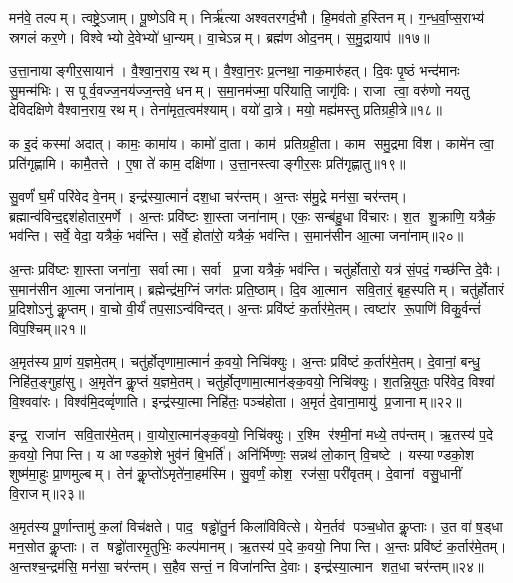 मन॑वे॒ तल्पम्। त्वष्ट्रे॒ऽजाम्। पू॒ष्णेऽविम्। निर्\mbox{}ऋ॑त्या अश्वतरगर्द॒भौ। हि॒मव॑तो ह॒स्तिनम्। ग॒न्ध॒र्वा॒प्स॒राभ्य॑ स्रगलं कर॒णे। विश्वेभ्यो दे॒वेभ्यो॑ धा॒न्यम्। वा॒चेऽन्नम्। ब्रह्म॑ण ओद॒नम्। स॒मु॒द्रायाप॑॥१७॥

उ॒त्ता॒नायाङ्गीर॒सायान॑। वै॒श्वा॒न॒राय॒ रथम्। वै॒श्वा॒न॒रः प्र॒त्नथा॒ नाक॒मारु॑हत्। दि॒वः पृ॒ष्ठं भन्द॑मानः सु॒मन्म॑भिः। स पूर्व॒वज्ज॒नय॑ज्ज॒न्तवे॒ धनम्। स॒मा॒नम॑ज्मा॒ परि॑याति॒ जागृ॑विः। राजा त्वा॒ वरु॑णो नयतु देविदक्षिणे वैश्वान॒राय॒ रथम्। तेना॑मृत॒त्वम॑श्याम्। वयो॑ दा॒त्रे। मयो॒ मह्य॑मस्तु प्रतिग्रही॒त्रे॥१८॥

क इ॒दं कस्मा॑ अदात्। कामः॒ कामा॑य। कामो॑ दा॒ता। काम॑ प्रतिग्रही॒ता। काम समु॒द्रमा वि॑श। कामे॑न त्वा॒ प्रति॑गृह्णामि। कामै॒तत्ते। ए॒षा ते॑ काम॒ दक्षि॑णा। उ॒त्ता॒नस्त्वाङ्गीर॒सः प्रति॑गृह्णातु॥१९॥
\anuvakamend[दा॒ता पुरु॑ष॒मप॑ प्रतिग्रही॒त्रे नव॑ च]

सु॒वर्णं॑ घ॒र्मं परि॑वेद वे॒नम्। इन्द्र॑स्या॒त्मानं॑ दश॒धा चर॑न्तम्। अ॒न्तः स॑मु॒द्रे मन॑सा॒ चर॑न्तम्। ब्रह्मान्व॑विन्द॒द्दश॑होतार॒मर्णे। अ॒न्तः प्रवि॑ष्टः  शा॒स्ता जना॑नाम्। एकः॒ सन्ब॑हु॒धा वि॑चारः। श॒त शु॒क्राणि॒ यत्रैकं॒ भव॑न्ति। सर्वे॒ वेदा॒ यत्रैकं॒ भव॑न्ति। सर्वे॒ होता॑रो॒ यत्रैकं॒ भव॑न्ति। स॒मान॑सीन आ॒त्मा जना॑नाम्॥२०॥%

अ॒न्तः प्रवि॑ष्टः  शा॒स्ता जना॑ना॒ सर्वात्मा। सर्वा प्र॒जा यत्रैकं॒ भव॑न्ति। चतु॑र्\mbox{}होतारो॒ यत्र॑ सं॒पदं॒ गच्छ॑न्ति दे॒वैः। स॒मान॑सीन आ॒त्मा जना॑नाम्। ब्रह्मेन्द्र॑म॒ग्निं जग॑तः प्रति॒ष्ठाम्। दि॒व आ॒त्मान सवि॒तारं॒ बृह॒स्पतिम्। चतु॑र्\mbox{}होतारं प्र॒दिशोऽनु॑ कॢ॒प्तम्। वा॒चो वी॒र्यं॑ तप॒साऽन्व॑विन्दत्। अ॒न्तः प्रवि॑ष्टं क॒र्तार॑मे॒तम्। त्वष्टा॑र रू॒पाणि॑ विकु॒र्वन्तं॑ विप॒श्चिम्॥२१॥

अ॒मृत॑स्य प्रा॒णं य॒ज्ञमे॒तम्। चतु॑र्\mbox{}होतृणामा॒त्मानं॑ क॒वयो॒ निचि॑क्युः। अ॒न्तः प्रवि॑ष्टं क॒र्तार॑मे॒तम्। दे॒वानां॒ बन्धु॒ निहि॑त॒ङ्गुहा॑सु। अ॒मृते॑न कॢ॒प्तं य॒ज्ञमे॒तम्। चतु॑र्\mbox{}होतृणामा॒त्मान॑ङ्क॒वयो॒ निचि॑क्युः। श॒तन्नि॒युतः॒ परि॑वेद॒ विश्वा॑ वि॒श्ववा॑रः। विश्व॑मि॒दव्वृं॑णाति। इन्द्र॑स्या॒त्मा निहि॑तः॒ पञ्च॑होता। अ॒मृतं॑ दे॒वाना॒मायु॑ प्र॒जानाम्॥२२॥%

इन्द्र॒ राजा॑न सवि॒तार॑मे॒तम्। वा॒योरा॒त्मान॑ङ्क॒वयो॒ निचि॑क्युः। र॒श्मि र॑श्मी॒नां मध्ये॒ तप॑न्तम्। ऋ॒तस्य॑ प॒दे क॒वयो॒ निपान्ति। य आण्डको॒शे भुव॑नं बि॒भर्ति॑। अनि॑र्भिण्णः॒ सन्नथ॑ लो॒कान् वि॒चष्टे। यस्याण्डको॒श शुष्म॑मा॒हुः प्रा॒णमुल्बम्। तेन॑ कॢ॒प्तो॑ऽमृते॑ना॒हम॑स्मि। सु॒वर्णं॒ कोश॒ रज॑सा॒ परी॑वृतम्। दे॒वानां वसु॒धानीं  वि॒राजम्॥२३॥%

अ॒मृत॑स्य पू॒र्णान्तामु॑ क॒लां  विच॑क्षते। पाद॒ षड्ढो॑तु॒र्न किला॑विवित्से। येन॒र्तव॑ पञ्च॒धोत कॢ॒प्ताः। उ॒त वा॑ ष॒ड्धा मन॒सोत कॢ॒प्ताः। त षड्ढो॑तारमृ॒तुभिः॒ कल्प॑मानम्। ऋ॒तस्य॑ प॒दे क॒वयो॒ निपान्ति। अ॒न्तः प्रवि॑ष्टं क॒र्तार॑मे॒तम्। अ॒न्तश्च॒न्द्रम॑सि॒ मन॑सा॒ चर॑न्तम्। स॒हैव सन्तं॒ न विजा॑नन्ति दे॒वाः। इन्द्र॑स्या॒त्मान शत॒धा चर॑न्तम्॥२४॥%

